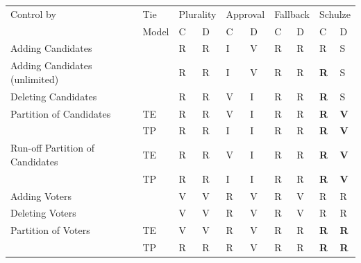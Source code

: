 \documentclass[a0paper,portrait]{baposter}
\begin{document}
\begin{poster}
{  \begin{tabular}{|l|l||l|l|l|l|l|l|l|l|}
    \hline
    Control by & Tie & 
    \multicolumn{2}{|c|}{Plurality} & \multicolumn{2}{|c|}{Approval} &  \multicolumn{2}{|c|}{Fallback} &
    \multicolumn{2}{|c|}{Schulze} \\
    & Model & C& D & C& D & C& D & C& D \\
    \hline \hline
    Adding Candidates & & R & R & I & V  & R & R & R & S\\
    \hline
    Adding Candidates (unlimited)  & & R & R & I & V & R & R & \textbf{R} & S \\
    \hline
    Deleting Candidates & & R & R & V & I & R & R & \textbf{R} & S\\
    \hline
    Partition of Candidates & TE & R & R & V & I  & R & R & \textbf{R} & \textbf{V}\\
    \hline
    & TP & R & R & I & I  & R & R & \textbf{R} & \textbf{V} \\
    \hline
    Run-off Partition of Candidates & TE & R & R & V & I  & R & R & \textbf{R}    & \textbf{V}\\
    \hline
    & TP & R & R & I & I  & R & R & \textbf{R} & \textbf{V}\\
    \hline
    Adding Voters & & V & V & R & V & R & V & R & R\\
    \hline
    Deleting Voters & & V & V & R & V & R & V & R & R\\
    \hline
    Partition of Voters & TE & V & V & R & V & R & R & \textbf{R} & \textbf{R}\\
    \hline
    & TP & R & R & R & V & R & R & \textbf{R} & \textbf{R} \\
    \hline
  \end{tabular}

}
\end{poster}
\end{document}
